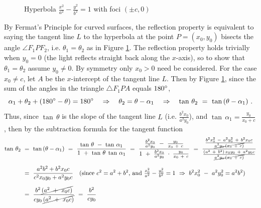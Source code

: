 \begin{figure}[h]
\begin{minipage}[b]{8.5cm}
\begin{center}
\vspace{-4mm}
 \end{center}
 \caption[]{\enskip Hyperbola $\frac{x^2}{a^2} - \frac{y^2}{b^2} = 1$ with foci $(\pm c,0)$}
 \label{fig:hyperreflpt1}
\end{minipage}
\end{figure}\vspace{-2mm}
By Fermat's Principle for curved surfaces, the reflection property is equivalent
to saying the tangent line $L$ to the hyperbola at the point $P=(x_0,y_0)$
bisects the angle $\angle F_1PF_2$, i.e. $\theta_1=\theta_2$ as in Figure
\ref{fig:hyperreflpt1}. The reflection property holds trivially when $y_0=0$
(the light reflects straight back along the $x$-axis), so to show that
$\theta_1=\theta_2$ assume $y_0 \ne 0$. By symmetry only $x_0 > 0$ need be
considered. For the case $x_0 \ne c$, let $A$ be the $x$-intercept of the
tangent line $L$. Then by Figure \ref{fig:hyperreflpt1}, since the sum of the
angles in the triangle $\triangle F_1PA$ equals $180^\circ$,
\[
\alpha_1 + \theta_2 + (180^\circ -\theta) = 180^\circ \quad\Rightarrow\quad
\theta_2 = \theta - \alpha_1 \quad\Rightarrow\quad
\tan\,\theta_2 ~=~ \tan\,(\theta - \alpha_1) ~.
\]
Thus, since $\tan\,\theta$ is the slope of the tangent line $L$ (i.e.
$\frac{b^2x_0}{a^2y_0}$), and $\tan\,\alpha_1 = \frac{y_0}{x_0 + c}$, then by
the subtraction formula for the tangent function
\begin{align*}
\tan\,\theta_2 ~&=~ \tan\,(\theta - \alpha_1) ~=~ \frac{\tan\,\theta ~-~ \tan\,\alpha_1}{1 ~+~ \tan\,\theta\;\tan\,\alpha_1} ~=~
 \frac{\frac{b^2x_0}{a^2y_0} ~-~ \frac{y_0}{x_0 ~+~ c}}{1 ~+~
 \frac{b^2x_0}{a^2y_0}\;\cdot\;\frac{y_0}{x_0 ~+~ c}} ~=~
 \frac{\frac{b^2 x_0^2 ~-~ a^2 y_0^2 ~+~ b^2 x_0 c}{\cancel{a^2 y_0\,(x_0 ~+~
  c)}}}{\frac{(a^2 ~+~ b^2)\,x_0 y_0 ~+~ a^2 y_0 c}{\cancel{a^2 y_0\,(x_0 ~+~ c)}}}\\[6pt]
&=~ \frac{a^2 b^2 + b^2 x_0 c}{c^2 x_0 y_0 + a^2 y_0 c}
 \quad\text{(since $c^2 = a^2 + b^2$, and $\tfrac{x_0^2}{a^2} - \tfrac{y_0^2}{b^2} = 1 ~\Rightarrow~
  b^2 x_0^2 ~-~ a^2 y_0^2 = a^2 b^2$)}\\[6pt]
&=~ \frac{b^2 \,\cancel{(a^2 ~+~ x_0 c)}}{cy_0\,\cancel{(a^2 ~+~ x_0 c)}} ~=~ \frac{b^2}{cy_0}
\end{align*}
